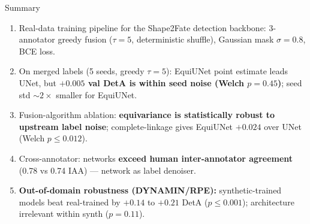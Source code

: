 \documentclass[10pt,aspectratio=169]{beamer}
\newcommand{\hilite}[1]{\textbf{\color{blue!60!black}#1}}
\begin{document}
\begin{frame}{Summary}
  \begin{enumerate}\setlength\itemsep{4pt}
    \item Real-data training pipeline for the Shape2Fate detection backbone:
          3-annotator greedy fusion ($\tau{=}5$, deterministic shuffle),
          Gaussian mask $\sigma{=}0.8$, BCE loss.
    \item On merged labels (5 seeds, greedy $\tau{=}5$): EquiUNet point estimate
          leads UNet, but \hilite{$+0.005$ val DetA is within seed noise
          (Welch $p = 0.45$)}; seed std $\sim 2 \times$ smaller for EquiUNet.
    \item Fusion-algorithm ablation: \hilite{equivariance is statistically robust
          to upstream label noise}; complete-linkage gives EquiUNet $+0.024$
          over UNet (Welch $p \leq 0.012$).
    \item Cross-annotator: networks \hilite{exceed human inter-annotator
          agreement} (0.78 vs 0.74 IAA) --- network as label denoiser.
    \item \hilite{Out-of-domain robustness (DYNAMIN/RPE):} synthetic-trained
          models beat real-trained by $+0.14$ to $+0.21$ DetA ($p \leq 0.001$);
          architecture irrelevant within synth ($p = 0.11$).
  \end{enumerate}
\end{frame}
\end{document}
